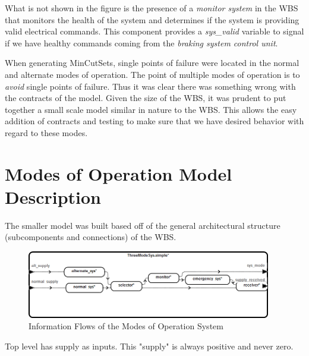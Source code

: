 \documentclass{article}
\begin{document}
What is not shown in the figure is the presence of a \textit{monitor system} in the WBS that monitors the health of the system and determines if the system is providing valid electrical commands. This component provides a \textit{sys\_valid} variable to signal if we have healthy commands coming from the \textit{braking system control unit}. 

When generating MinCutSets, single points of failure were located in the normal and alternate modes of operation. The point of multiple modes of operation is to \textit{avoid} single points of failure. Thus it was clear there was something wrong with the contracts of the model. Given the size of the WBS, it was prudent to put together a small scale model similar in nature to the WBS. This allows the easy addition of contracts and testing to make sure that we have desired behavior with regard to these modes. 

\section{Modes of Operation Model Description}
The smaller model was built based off of the general architectural structure (subcomponents and connections) of the WBS. 
\begin{figure}[h]
\begin{center}
\includegraphics[width=0.95\textwidth]{images/modes_flows} 
\caption{Information Flows of the Modes of Operation System}
\label{fig:modes1}
\end{center}
\end{figure}
Top level has supply as inputs. This "supply" is always positive and never zero. 
\end{document}
